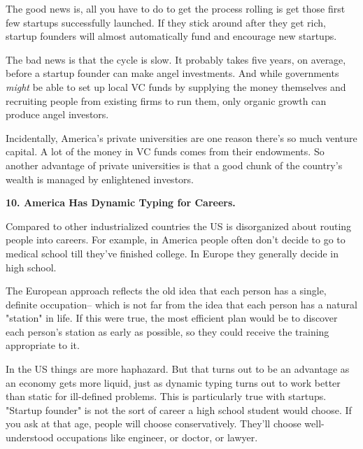 The good news is,
                  all you have to do to get the process rolling is get those
                  first few startups successfully launched. If they stick around
                  after they get rich, startup founders will almost
                  automatically fund and encourage new startups.

The
                  bad news is that the cycle is slow. It probably takes five
                  years, on average, before a startup founder can make angel
                  investments. And while governments \emph{might} be able to set
                  up local VC funds by supplying the money themselves and
                  recruiting people from existing firms to run them, only
                  organic growth can produce angel investors.

Incidentally,
                  America's private universities are one reason there's so much
                  venture capital. A lot of the money in VC funds comes from
                  their endowments. So another advantage of private universities
                  is that a good chunk of the country's wealth is managed by
                  enlightened investors.

\textbf{10. America Has Dynamic Typing for Careers.}

Compared to other industrialized countries the US
                  is disorganized about routing people into careers. For
                  example, in America people often don't decide to go to medical
                  school till they've finished college. In Europe they generally
                  decide in high school.

The European approach
                  reflects the old idea that each person has a single, definite
                  occupation-- which is not far from the idea that each person
                  has a natural "station" in life. If this were true, the most
                  efficient plan would be to discover each person's station as
                  early as possible, so they could receive the training
                  appropriate to it.

In the US things are more
                  haphazard. But that turns out to be an advantage as an economy
                  gets more liquid, just as dynamic typing turns out to work
                  better than static for ill-defined problems. This is
                  particularly true with startups. "Startup founder" is not the
                  sort of career a high school student would choose. If you ask
                  at that age, people will choose conservatively. They'll choose
                  well-understood occupations like engineer, or doctor, or
                  lawyer.

